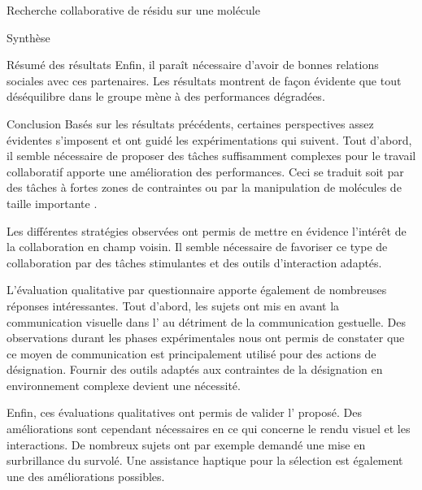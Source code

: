 \documentclass[myfrancais,ngerman,english,frenchb]{mythesis}
\begin{document}
\begin{mychapter}{Recherche collaborative de résidu sur une molécule}
\begin{mysection}{Synthèse}
\begin{mysubsection}{Résumé des résultats}
				Enfin, il paraît nécessaire d'avoir de bonnes relations sociales avec ces partenaires.
				Les résultats montrent de façon évidente que tout déséquilibre dans le groupe mène à des performances dégradées.
			\end{mysubsection}
			\begin{mysubsection}{Conclusion}
				Basés sur les résultats précédents, certaines perspectives assez évidentes s'imposent et ont guidé les expérimentations qui suivent.
				Tout d'abord, il semble nécessaire de proposer des tâches suffisamment complexes pour le travail collaboratif apporte une amélioration des performances.
				Ceci se traduit soit par des tâches à fortes zones de contraintes  ou par la manipulation de molécules de taille importante .

				Les différentes stratégies observées ont permis de mettre en évidence l'intérêt de la collaboration en champ voisin.
				Il semble nécessaire de favoriser ce type de collaboration par des tâches stimulantes et des outils d'interaction adaptés.

				L'évaluation qualitative par questionnaire apporte également de nombreuses réponses intéressantes.
				Tout d'abord, les sujets ont mis en avant la communication visuelle dans l' au détriment de la communication gestuelle.
				Des observations durant les phases expérimentales nous ont permis de constater que ce moyen de communication est principalement utilisé pour des actions de désignation.
				Fournir des outils adaptés aux contraintes de la désignation en environnement complexe devient une nécessité.

				Enfin, ces évaluations qualitatives ont permis de valider l' proposé.
				Des améliorations sont cependant nécessaires en ce qui concerne le rendu visuel et les interactions.
				De nombreux sujets ont par exemple demandé une mise en surbrillance du  survolé.
				Une assistance haptique pour la sélection est également une des améliorations possibles.
			\end{mysubsection}
		\end{mysection}
	\end{mychapter}
\end{document}
